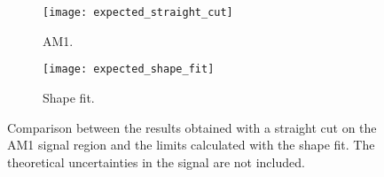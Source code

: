 \begin{figure}[!h]
  \centering
  \begin{subfigure}[t]{.48\linewidth}
    \texttt{[image: expected\_straight\_cut]}
    \caption{AM1.}
    \label{fig:expected_im1}
  \end{subfigure}
  \begin{subfigure}[t]{.48\linewidth}
    \texttt{[image: expected\_shape\_fit]}
    \caption{Shape fit.}
    \label{fig:expected_straight}
  \end{subfigure}
  \caption{Comparison between the results obtained with a straight cut on the
    AM1 signal region and the limits calculated with the shape fit. The
    theoretical uncertainties in the signal are not included.}
  \label{fig:shape_straight_comparison}
\end{figure}

